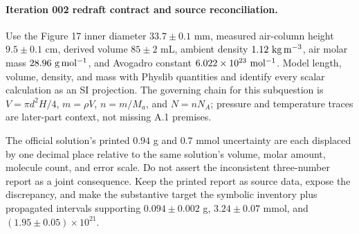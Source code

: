 \paragraph{Iteration 002 redraft contract and source reconciliation.}
Use the Figure 17 inner diameter \(33.7\pm0.1\) mm, measured air-column
height \(9.5\pm0.1\) cm, derived volume \(85\pm2\) mL, ambient density
\(1.12\ {\rm kg\,m^{-3}}\), air molar mass \(28.96\ {\rm g\,mol^{-1}}\),
and Avogadro constant \(6.022\times10^{23}\ {\rm mol^{-1}}\).  Model length,
volume, density, and mass with Physlib quantities and identify every scalar
calculation as an SI projection.  The governing chain for this subquestion is
\(V=\pi d^2H/4\), \(m=\rho V\), \(n=m/M_a\), and \(N=nN_A\); pressure and
temperature traces are later-part context, not missing A.1 premises.

The official solution's printed \(0.94\) g and \(0.7\) mmol uncertainty are
each displaced by one decimal place relative to the same solution's volume,
molar amount, molecule count, and error scale.  Do not assert the inconsistent
three-number report as a joint consequence.  Keep the printed report as
source data, expose the discrepancy, and make the substantive target the
symbolic inventory plus propagated intervals supporting
\(0.094\pm0.002\) g, \(3.24\pm0.07\) mmol, and
\((1.95\pm0.05)\times10^{21}\).


